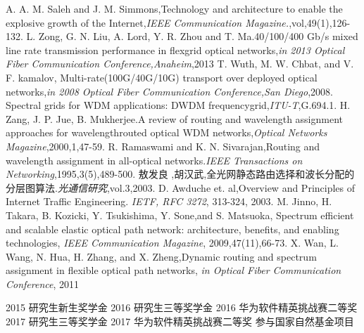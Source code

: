 \documentclass[master]{thesis-uestc}
\begin{document}
\begin{thebibliography}{1}
A. A. M. Saleh and J. M. Simmons,Technology and architecture to enable the explosive growth of the Internet,\emph{IEEE Communication Magazine.},vol,49(1),126-132.
L. Zong, G. N. Liu, A. Lord, Y. R. Zhou and T. Ma.40/100/400 Gb/s mixed line rate transmission performance in flexgrid optical networks,\emph{in 2013 Optical Fiber Communication Conference,Anaheim},2013
T. Wuth, M. W. Chbat, and V. F. kamalov, Multi-rate(100G/40G/10G) transport over deployed optical networks,\emph{in 2008 Optical Fiber Communication Conference,San Diego},2008.
Spectral grids for WDM applications: DWDM frequencygrid,\emph{ITU-T},G.694.1.
H. Zang, J. P. Jue, B. Mukherjee.A review of routing and wavelength assignment approaches for wavelengthrouted optical WDM networks,\emph{Optical Networks Magazine},2000,1,47-59.
R. Ramaswami and K. N. Sivarajan,Routing and wavelength assignment in all-optical networks.\emph{IEEE Transactions on Networking},1995,3(5),489-500.
敖发良 ,胡汉武,全光网静态路由选择和波长分配的分层图算法.\emph{光通信研究},vol.3,2003.
D. Awduche et. al,Overview and Principles of Internet Traffic Engineering. \emph{IETF, RFC 3272}, 313-324, 2003.
M. Jinno, H. Takara, B. Kozicki, Y. Tsukishima, Y. Sone,and S. Matsuoka, Spectrum efficient and scalable elastic optical path network: architecture, benefits, and enabling technologies, \emph{IEEE Communication Magazine}, 2009,47(11),66-73.
X. Wan, L. Wang, N. Hua, H. Zhang, and X. Zheng,Dynamic routing and spectrum assignment in flexible optical path networks, \emph{in Optical Fiber Communication Conference}, 2011
\end{thebibliography}
\begin{thesisachievement}
 2015 研究生新生奖学金
 2016 研究生三等奖学金
 2016 华为软件精英挑战赛二等奖
 2017 研究生三等奖学金
 2017 华为软件精英挑战赛二等奖
 参与国家自然基金项目
\end{thesisachievement}
\end{document}
